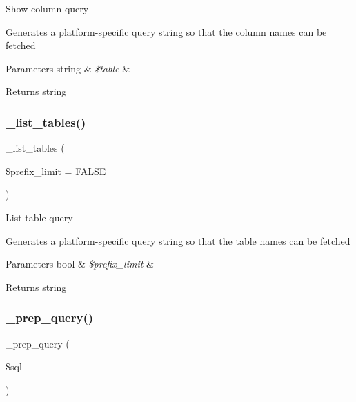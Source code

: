 Show column query

Generates a platform-\/specific query string so that the column names can be fetched


\begin{DoxyParams}[1]{Parameters}
string & {\em \$table} & \\
\hline
\end{DoxyParams}
\begin{DoxyReturn}{Returns}
string 
\end{DoxyReturn}
\mbox{\label{class_c_i___d_b__mysql__driver_a435c0f3ce54fe7daa178baa8532ebd54}} 
\subsubsection{\texorpdfstring{\+\_\+list\+\_\+tables()}{\_list\_tables()}}
{\footnotesize\ttfamily \+\_\+list\+\_\+tables (\begin{DoxyParamCaption}\item[{}]{\$prefix\+\_\+limit = {\ttfamily FALSE} }\end{DoxyParamCaption})\hspace{0.3cm}{\ttfamily [protected]}}

List table query

Generates a platform-\/specific query string so that the table names can be fetched


\begin{DoxyParams}[1]{Parameters}
bool & {\em \$prefix\+\_\+limit} & \\
\hline
\end{DoxyParams}
\begin{DoxyReturn}{Returns}
string 
\end{DoxyReturn}
\mbox{\label{class_c_i___d_b__mysql__driver_a86af88ef0fa6d44ab4691e3f53270339}} 
\subsubsection{\texorpdfstring{\+\_\+prep\+\_\+query()}{\_prep\_query()}}
{\footnotesize\ttfamily \+\_\+prep\+\_\+query (\begin{DoxyParamCaption}\item[{}]{\$sql }\end{DoxyParamCaption})\hspace{0.3cm}{\ttfamily [protected]}}

